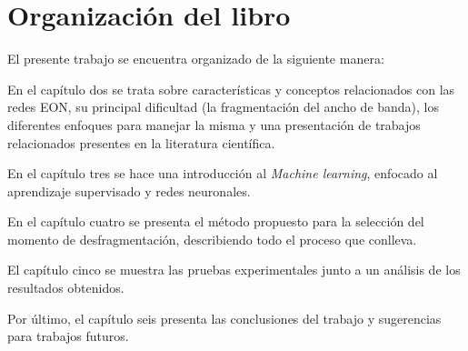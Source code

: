 \section{Organización del libro}
El presente trabajo se encuentra organizado de la siguiente manera:

En el capítulo dos se trata sobre características y conceptos relacionados con las redes EON, su principal
dificultad (la fragmentación del ancho de banda), los diferentes enfoques para manejar la misma y una 
presentación de trabajos relacionados presentes en la literatura científica.

En el capítulo tres se hace una introducción al \textit{Machine learning}, enfocado al aprendizaje supervisado y redes neuronales.

En el capítulo cuatro se presenta el método propuesto para la selección del momento de desfragmentación, 
describiendo todo el proceso que conlleva.

El capítulo cinco se muestra las pruebas experimentales junto a un análisis de los resultados obtenidos.

Por último, el capítulo seis presenta las conclusiones del trabajo y sugerencias para trabajos futuros. 